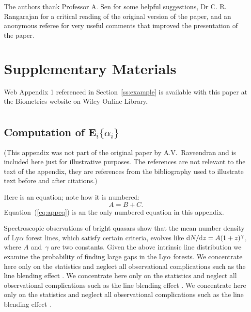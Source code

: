 \documentclass[useAMS,usenatbib]{biom}
\begin{document}
The authors thank Professor A. Sen for some helpful suggestions,
Dr C. R. Rangarajan for a critical reading of the original version of the
paper, and an anonymous referee for very useful comments that improved
the presentation of the paper.\vspace*{-8pt}


\section*{Supplementary Materials}

Web Appendix 1 referenced in Section~\ref{ss:example} is available
with this paper at the Biometrics website on Wiley Online Library.
\vspace*{-8pt}


 

\appendix

\section{}
\subsection{Computation of E$_i\{\alpha_i\}$}

(This appendix was not part of the original paper by
A.V.~Raveendran and is included here just for illustrative
purposes. The references are not relevant to the text of the
appendix, they are references from the bibliography used to
illustrate text before and after citations.)

Here is an equation; note how it is numbered:
\begin{equation}
A = B+C. 
\label{eq:appeq}
\end{equation}
Equation~(\ref{eq:appeq}) is an the only numbered equation in this appendix.

Spectroscopic observations of bright quasars show that the mean
number density of Ly$\alpha$ forest lines, which satisfy certain
criteria, evolves like ${\mathrm{d}}N/{\mathrm{d}}z=A(1+z)^\gamma$, where
$A$ and~$\gamma$ are two constants.  Given the above intrinsic
line distribution we examine the probability of finding large gaps
in the Ly$\alpha$ forests.  We concentrate here only on the
statistics and neglect all observational complications such as the
line blending effect \citep[see][for example]{b11}. We concentrate here only on the
statistics and neglect all observational complications such as the
line blending effect \citep[see][for example]{b11}. We concentrate here only on the
statistics and neglect all observational complications such as the
line blending effect \citep[see][for example]{b11}. 
\end{document}
